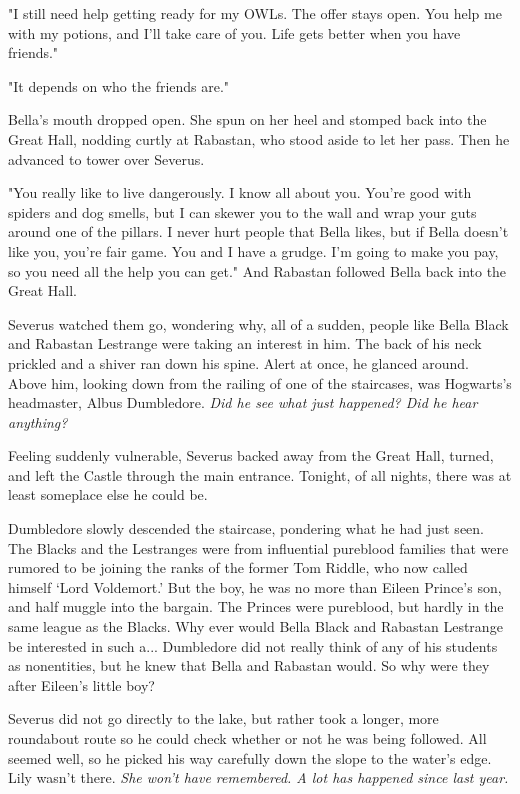 \documentclass[a4paper,11pt]{article}
\begin{document}
"I still need help getting ready for my OWLs. The offer stays open. You help me with my potions, and I'll take care of you. Life gets better when you have friends."

"It depends on who the friends are."

Bella's mouth dropped open. She spun on her heel and stomped back into the Great Hall, nodding curtly at Rabastan, who stood aside to let her pass. Then he advanced to tower over Severus.

"You really like to live dangerously. I know all about you. You're good with spiders and dog smells, but I can skewer you to the wall and wrap your guts around one of the pillars. I never hurt people that Bella likes, but if Bella doesn't like you, you're fair game. You and I have a grudge. I'm going to make you pay, so you need all the help you can get." And Rabastan followed Bella back into the Great Hall.

Severus watched them go, wondering why, all of a sudden, people like Bella Black and Rabastan Lestrange were taking an interest in him. The back of his neck prickled and a shiver ran down his spine. Alert at once, he glanced around. Above him, looking down from the railing of one of the staircases, was Hogwarts's headmaster, Albus Dumbledore. \emph{Did he see what just happened? Did he hear anything?}

Feeling suddenly vulnerable, Severus backed away from the Great Hall, turned, and left the Castle through the main entrance. Tonight, of all nights, there was at least someplace else he could be.

Dumbledore slowly descended the staircase, pondering what he had just seen. The Blacks and the Lestranges were from influential pureblood families that were rumored to be joining the ranks of the former Tom Riddle, who now called himself `Lord Voldemort.' But the boy, he was no more than Eileen Prince's son, and half muggle into the bargain. The Princes were pureblood, but hardly in the same league as the Blacks. Why ever would Bella Black and Rabastan Lestrange be interested in such a... Dumbledore did not really think of any of his students as nonentities, but he knew that Bella and Rabastan would. So why were they after Eileen's little boy?

Severus did not go directly to the lake, but rather took a longer, more roundabout route so he could check whether or not he was being followed. All seemed well, so he picked his way carefully down the slope to the water's edge. Lily wasn't there. \emph{She won't have remembered. A lot has happened since last year.}
\end{document}
